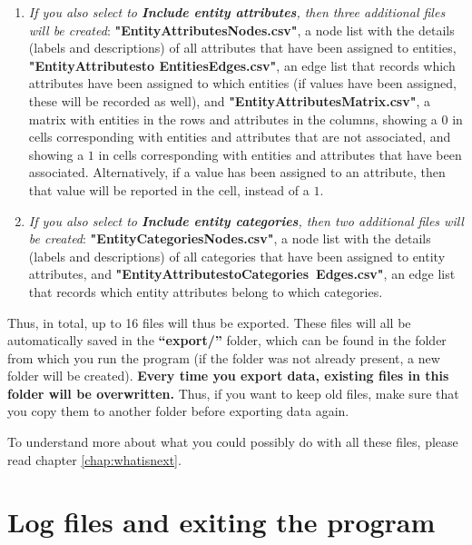 \documentclass{memoir}
\begin{document}
\begin{enumerate}
\item{\emph{If you also select to \textbf{Include entity attributes}, then three additional files will be created}: \textbf{"Entity\textunderscore Attributes\textunderscore Nodes.csv"}, a node list with the details (labels and descriptions) of all attributes that have been assigned to entities, \textbf{"Entity\textunderscore Attributes\textunderscore to \textunderscore Entities\textunderscore Edges.csv"}, an edge list that records which attributes have been assigned to which entities (if values have been assigned, these will be recorded as well), and \textbf{"Entity\textunderscore Attributes\textunderscore Matrix.csv"}, a matrix with entities in the rows and attributes in the columns, showing a \(0\) in cells corresponding with entities and attributes that are not associated, and showing a \(1\) in cells corresponding with entities and attributes that have been associated. Alternatively, if a value has been assigned to an attribute, then that value will be reported in the cell, instead of a \(1\).}
\item{\emph{If you also select to \textbf{Include entity categories}, then two additional files will be created}: \textbf{"Entity\textunderscore Categories\textunderscore Nodes.csv"}, a node list with the details (labels and descriptions) of all categories that have been assigned to entity attributes, and \textbf{"Entity\textunderscore Attributes\textunderscore to\textunderscore Categories\textunderscore \ Edges.csv"}, an edge list that records which entity attributes belong to which categories.}
\end{enumerate}

Thus, in total, up to 16 files will thus be exported. These files will all be automatically saved in the \textbf{``export/''} folder, which can be found in the folder from which you run the program (if the folder was not already present, a new folder will be created). \textbf{Every time you export data, existing files in this folder will be overwritten.} Thus, if you want to keep old files, make sure that you copy them to another folder before exporting data again.

To understand more about what you could possibly do with all these files, please read chapter \ref{chap:whatisnext}.

\section{Log files and exiting the program}
\label{sec:logfilesandexiting}
\end{document}
